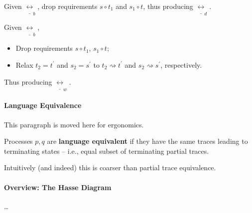 \documentclass[99-notes-packed.tex]{subfiles}
\begin{document}
\begin{definition}
    Given $\underline{\leftrightarrow}_{b}$, drop requirements $s \circ t_1$ and $s_1 \circ t$, thus producing $\underline{\leftrightarrow}_{d}$.
\end{definition}

\begin{definition}
    Given $\underline{\leftrightarrow}_{b}$, 
    \begin{itemize}
        \item Drop requirements $s \circ t_1$, $s_1 \circ t$; 
        \item Relax $t_2 = t^{'}$ and $s_2 = s^{'}$ to $t_2 \rightsquigarrow t^{'}$ and $s_2 \rightsquigarrow s^{'}$, respectively.
    \end{itemize}
    Thus producing $\underline{\leftrightarrow}_{w}$.
\end{definition}

\paragraph*{Language Equivalence} This paragraph is moved here for ergonomics.
\begin{definition}
    Processes $p, q$ are \textbf{language equivalent} if they have the same traces leading to terminating states -- i.e., equal subset of terminating partial traces. 

    Intuitively (and indeed) this is coarser than partial trace equivalence. 
\end{definition}

\paragraph*{Overview: The Hasse Diagram}
\dots
\end{document}
